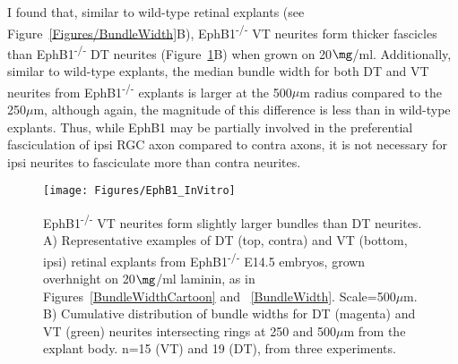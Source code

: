 I found that, similar to wild-type retinal explants (see Figure~\ref{Figures/BundleWidth}B), EphB1\textsuperscript{-/-} VT neurites form thicker fascicles than EphB1\textsuperscript{-/-} DT neurites (Figure~\ref{EphB1InVitro}B) when grown on 20$\mg$/ml.
Additionally, similar to wild-type explants, the median bundle width for both DT and VT neurites from EphB1\textsuperscript{-/-} explants is larger at the 500$\mu$m radius compared to the 250$\mu$m, although again, the magnitude of this difference is less than in wild-type explants.
Thus, while EphB1 may be partially involved in the preferential fasciculation of ipsi RGC axon compared to contra axons, it is not necessary for ipsi neurites to fasciculate more than contra neurites. 
\begin{figure}[hbtp]
    \begin{center}
        \texttt{[image: Figures/EphB1\_InVitro]}
        \caption[EphB1\textsuperscript{-/-} VT neurites form slightly larger bundles than DT neurites.]
        {EphB1\textsuperscript{-/-} VT neurites form slightly larger bundles than DT neurites.
		A) Representative examples of DT (top, contra) and VT (bottom, ipsi) retinal explants from EphB1\textsuperscript{-/-} E14.5 embryos, grown overhnight on 20$\mg$/ml laminin, as in Figures~\ref{BundleWidthCartoon} and ~\ref{BundleWidth}.
		Scale=500$\mu$m.
		B) Cumulative distribution of bundle widths for DT (magenta) and VT (green) neurites intersecting rings at 250 and 500$\mu$m from the explant body. 
		n=15 (VT) and 19 (DT), from three experiments.
		}
        \label{EphB1InVitro}
    \end{center}
\end{figure}